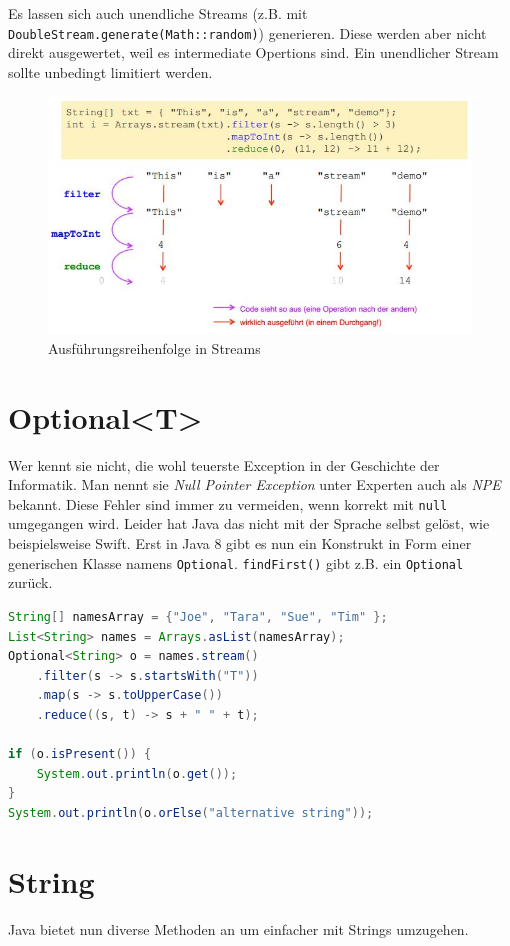 Es lassen sich auch unendliche Streams (z.B. mit \verb|DoubleStream.generate(Math::random)|) generieren. Diese werden aber nicht direkt ausgewertet, weil es intermediate Opertions sind. Ein unendlicher Stream sollte unbedingt limitiert werden.

\begin{figure}[h!]
\centering
\includegraphics[width=0.6\linewidth]{fig/java-stream-executions}
\caption{Ausführungsreihenfolge in Streams}
\label{fig:java-stream-executions}
\end{figure}

\newpage

\section{Optional<T>}
Wer kennt sie nicht, die wohl teuerste Exception in der Geschichte der Informatik. Man nennt sie \emph{Null Pointer Exception} unter Experten auch als \emph{NPE} bekannt. Diese Fehler sind immer zu vermeiden, wenn korrekt mit \verb|null| umgegangen wird. Leider hat Java das nicht mit der Sprache selbst gelöst, wie beispielsweise Swift. Erst in Java 8 gibt es nun ein Konstrukt in Form einer generischen Klasse namens \verb|Optional|. \verb|findFirst()| gibt z.B. ein \verb|Optional| zurück.

\begin{lstlisting}[language=Java, caption=Optional]
String[] namesArray = {"Joe", "Tara", "Sue", "Tim" };
List<String> names = Arrays.asList(namesArray);
Optional<String> o = names.stream()
	.filter(s -> s.startsWith("T"))
	.map(s -> s.toUpperCase())
	.reduce((s, t) -> s + " " + t);
	
if (o.isPresent()) {
	System.out.println(o.get());
}
System.out.println(o.orElse("alternative string"));
\end{lstlisting}

\section{String}
Java bietet nun diverse Methoden an um einfacher mit Strings umzugehen.

